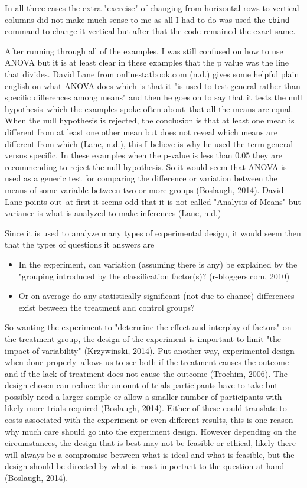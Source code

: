 \documentclass[10pt]{article}
\begin{document}
In all three cases the extra "exercise" of changing from horizontal rows to vertical columns did not make much sense to me as all I had to do was used the  \verb|cbind| command to change it vertical but after that the code remained the exact same.

After running through all of the examples, I was still confused on how to use ANOVA but it is at least clear in these examples that the p value was the line that divides. David Lane from onlinestatbook.com (n.d.) gives some helpful plain english on what ANOVA does which is that it "is used to test general rather than specific differences among means" and then he goes on to say that it tests the null hypothesis--which the examples spoke often about--that all the means are equal. When the null hypothesis is rejected, the conclusion is that at least one mean is different from at least one other mean but does not reveal which means are different from which (Lane, n.d.), this I believe is why he used the term general versus specific. In these examples when the p-value is less than 0.05 they are recommending to reject the null hypothesis. So it would seem that ANOVA is used as a generic test for comparing the difference or variation between the means of some variable between two or more groups (Boslaugh, 2014). David Lane points out--at first it seems odd that it is not called "Analysis of Means" but variance is what is analyzed to make inferences (Lane, n.d.)

Since it is used to analyze many types of experimental design, it would seem then that the types of questions it answers are
\begin{itemize}
\item In the experiment, can variation (assuming there is any) be explained by the "grouping introduced by the classification factor(s)? (r-bloggers.com, 2010)
\item Or on average do any statistically significant (not due to chance) differences exist between the treatment and control groups?
\end{itemize}
So wanting the experiment to "determine the effect and interplay of factors" on the treatment group, the design of the experiment is important to limit "the impact of variability" (Krzywinski, 2014). Put another way, experimental design--when done properly--allows us to see both if the treatment causes the outcome and if the lack of treatment does not cause the outcome (Trochim, 2006). The design chosen can reduce the amount of trials participants have to take but possibly need a larger sample or allow a smaller number of participants with likely more trials required (Boslaugh, 2014). Either of these could translate to costs associated with the experiment or even different results, this is one reason why much care should go into the experiment design. However depending on the circumstances, the design that is best may not be feasible or ethical, likely there will always be a compromise between what is ideal and what is feasible, but the design should be directed by what is most important to the question at hand (Boslaugh, 2014).
\end{document}
